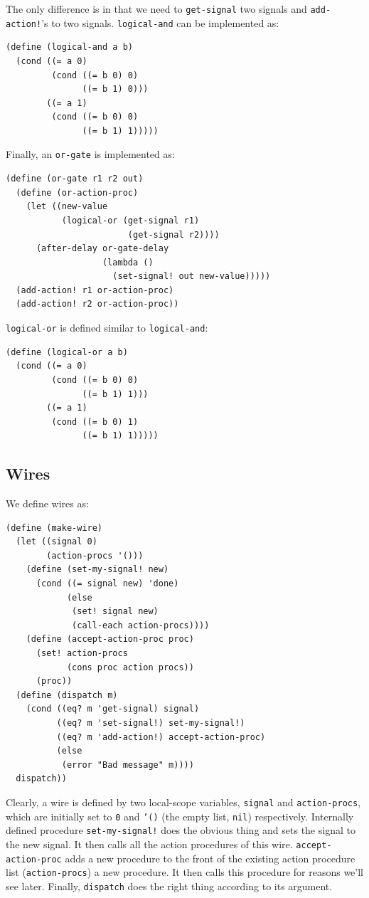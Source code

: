 \documentclass[9pt]{report}
\begin{document}
The only difference is in that we need to \texttt{get-signal} two signals
and \texttt{add-action!}'s to two signals. \texttt{logical-and} can be
implemented as:

\begin{verbatim}
(define (logical-and a b)
  (cond ((= a 0)
         (cond ((= b 0) 0)
               ((= b 1) 0)))
        ((= a 1)
         (cond ((= b 0) 0)
               ((= b 1) 1)))))
\end{verbatim}

Finally, an \texttt{or-gate} is implemented as:
\begin{verbatim}
(define (or-gate r1 r2 out)
  (define (or-action-proc)
    (let ((new-value
           (logical-or (get-signal r1)
                        (get-signal r2))))
      (after-delay or-gate-delay
                   (lambda ()
                     (set-signal! out new-value)))))
  (add-action! r1 or-action-proc)
  (add-action! r2 or-action-proc))
\end{verbatim}

\texttt{logical-or} is defined similar to \texttt{logical-and}:

\begin{verbatim}
(define (logical-or a b)
  (cond ((= a 0)
         (cond ((= b 0) 0)
               ((= b 1) 1)))
        ((= a 1)
         (cond ((= b 0) 1)
               ((= b 1) 1)))))
\end{verbatim}

\subsection{Wires}
\label{sec:org695c634}

We define wires as:

\begin{verbatim}
(define (make-wire)
  (let ((signal 0)
        (action-procs '()))
    (define (set-my-signal! new)
      (cond ((= signal new) 'done)
            (else
             (set! signal new)
             (call-each action-procs))))
    (define (accept-action-proc proc)
      (set! action-procs
            (cons proc action procs))
      (proc))
  (define (dispatch m)
    (cond ((eq? m 'get-signal) signal)
          ((eq? m 'set-signal!) set-my-signal!)
          ((eq? m 'add-action!) accept-action-proc)
          (else
           (error "Bad message" m))))
  dispatch))
\end{verbatim}

Clearly, a wire is defined by two local-scope variables, \texttt{signal}
and \texttt{action-procs}, which are initially set to \texttt{0} and \texttt{'()} (the
empty list, \texttt{nil}) respectively. Internally defined procedure
\texttt{set-my-signal!} does the obvious thing and sets the signal to the
new signal. It then calls all the action procedures of this wire.
\texttt{accept-action-proc} adds a new procedure to the front of the
existing action procedure list (\texttt{action-procs}) a new procedure.
It then calls this procedure for reasons we'll see later. Finally,
\texttt{dispatch} does the right thing according to its argument.
\end{document}
